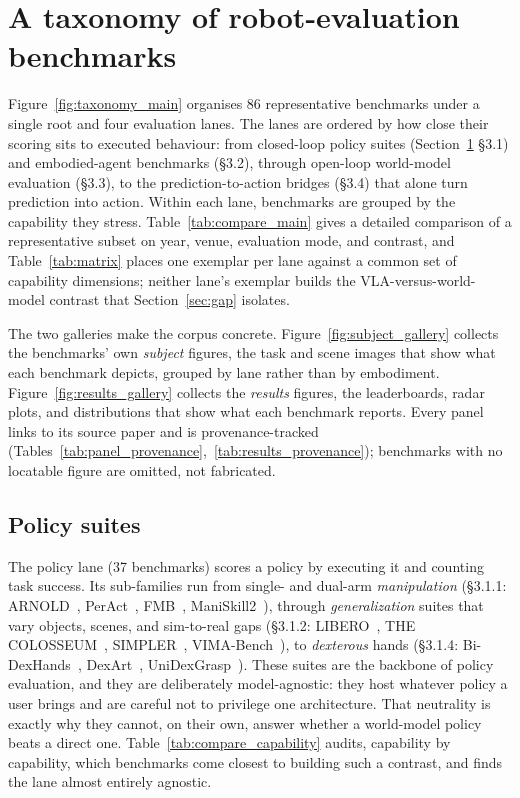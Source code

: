\section{A taxonomy of robot-evaluation benchmarks}
\label{sec:taxonomy}

Figure~\ref{fig:taxonomy_main} organises 86 representative benchmarks under a single root and four
evaluation lanes. The lanes are ordered by how close their scoring sits to executed behaviour: from
closed-loop policy suites (Section~\ref{sec:taxonomy} \S3.1) and embodied-agent benchmarks (\S3.2),
through open-loop world-model evaluation (\S3.3), to the prediction-to-action bridges (\S3.4) that
alone turn prediction into action. Within each lane, benchmarks are grouped by the capability they
stress. Table~\ref{tab:compare_main} gives a detailed comparison of a representative subset on
year, venue, evaluation mode, and contrast, and Table~\ref{tab:matrix} places one exemplar per lane
against a common set of capability dimensions; neither lane's exemplar builds the VLA-versus-world-model
contrast that Section~\ref{sec:gap} isolates.





The two galleries make the corpus concrete. Figure~\ref{fig:subject_gallery} collects the
benchmarks' own \emph{subject} figures, the task and scene images that show what each benchmark
depicts, grouped by lane rather than by embodiment. Figure~\ref{fig:results_gallery} collects the
\emph{results} figures, the leaderboards, radar plots, and distributions that show what each
benchmark reports. Every panel links to its source paper and is provenance-tracked
(Tables~\ref{tab:panel_provenance},~\ref{tab:results_provenance}); benchmarks with no locatable
figure are omitted, not fabricated.



\subsection{Policy suites}
\label{sec:lane_policy}

The policy lane (37 benchmarks) scores a policy by executing it and counting task success. Its
sub-families run from single- and dual-arm \emph{manipulation} (\S3.1.1: ARNOLD~\cite{arnold},
PerAct~\cite{peract}, FMB~\cite{fmb}, ManiSkill2~\cite{maniskill2}), through
\emph{generalization} suites that vary objects, scenes, and sim-to-real gaps (\S3.1.2:
LIBERO~\cite{libero}, THE COLOSSEUM~\cite{thecolosseum}, SIMPLER~\cite{simpler},
VIMA-Bench~\cite{vimabench}), to \emph{dexterous} hands (\S3.1.4: Bi-DexHands~\cite{bidexhands},
DexArt~\cite{dexart}, UniDexGrasp~\cite{unidexgrasp}). These suites are the backbone of policy
evaluation, and they are deliberately model-agnostic: they host whatever policy a user brings and are
careful not to privilege one architecture. That neutrality is exactly why they cannot, on their own,
answer whether a world-model policy beats a direct one. Table~\ref{tab:compare_capability} audits,
capability by capability, which benchmarks come closest to building such a contrast, and finds the
lane almost entirely agnostic.

